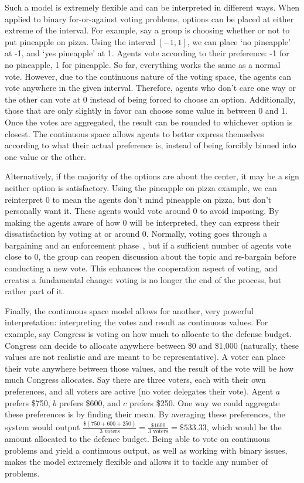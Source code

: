 Such a model is extremely flexible and can be interpreted in different ways.
When applied to binary for-or-against voting problems, options can be placed at either
extreme of the interval.
For example, say a group is choosing whether or not to put pineapple on pizza.
Using the interval $[-1, 1]$, we can place `no pineapple' at -1, and `yes pineapple'
at 1.
Agents vote according to their preference: -1 for no pineapple, 1 for pineapple.
So far, everything works the same as a normal vote.
However, due to the continuous nature of the voting space, the agents can vote
anywhere in the given interval.
Therefore, agents who don't care one way or the other can vote at 0 instead of being
forced to choose an option.
Additionally, those that are only slightly in favor can choose some value in between
0 and 1.
Once the votes are aggregated, the result can be rounded to whichever option is
closest.
The continuous space allows agents to better express themselves according to what
their actual preference is, instead of being forcibly binned into one value or the
other.

Alternatively, if the majority of the options are about the center, it may be a sign
neither option is satisfactory.
Using the pineapple on pizza example, we can reinterpret 0 to mean the agents don't
mind pineapple on pizza, but don't personally want it.
These agents would vote around 0 to avoid imposing.
By making the agents aware of how 0 will be interpreted, they can express their
dissatisfaction by voting at or around 0.
Normally, voting goes through a bargaining and an enforcement
phase~\cite{Fearon1998}, but if a sufficient number of agents vote close to 0, the
group can reopen discussion about the topic and re-bargain before conducting a new vote.
This enhances the cooperation aspect of voting, and creates a fundamental change:
voting is no longer the end of the process, but rather part of it.

Finally, the continuous space model allows for another, very powerful interpretation:
interpreting the votes and result as continuous values.
For example, say Congress is voting on how much to allocate to the defense budget.
Congress can decide to allocate anywhere between \$0 and \$1,000 (naturally, these
values are not realistic and are meant to be representative).
A voter can place their vote anywhere between those values, and the result of the
vote will be how much Congress allocates.
Say there are three voters, each with their own preferences, and all voters are
active (no voter delegates their vote).
Agent $a$ prefers \$750, $b$ prefers \$600, and $c$ prefers \$250.
One way we could aggregate these preferences is by finding their mean.
By averaging these preferences, the system would output
$\frac{\$(750 + 600 + 250)}{3 \text{ voters}} = \frac{\$1600}{3 \text{ voters}} =
\$533.33$,
which would be the amount allocated to the defence budget.
Being able to vote on continuous problems and yield a continuous output, as well as
working with binary issues, makes the model extremely flexible and allows it to
tackle any number of problems.

